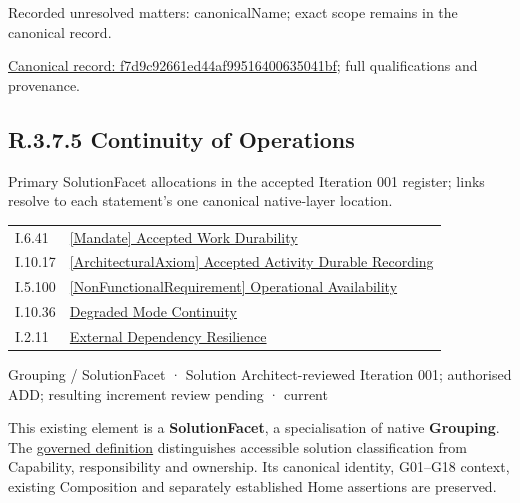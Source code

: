 {\small Recorded unresolved matters: canonicalName; exact scope remains in the canonical record.}\par
{\footnotesize \href{../../../../../../../continuum/grouping/f7d9c92661ed44af99516400635041bf.md}{Canonical record: f7d9c92661ed44af99516400635041bf}; full qualifications and provenance.}\par
\subsection*{R.3.7.5 Continuity of Operations}
\label{navigation:R.3.7.5}

Primary SolutionFacet allocations in the accepted Iteration 001 register; links resolve to each statement’s one canonical native-layer location.\par
\begin{longtable}{p{.22\linewidth}p{.73\linewidth}}
I.6.41 & \hyperref[element:eabd38371b6940289d9a4bf8e9773942]{[Mandate] Accepted Work Durability} \\
I.10.17 & \hyperref[element:6ee491b8c08d41868c3a7652fb794756]{[ArchitecturalAxiom] Accepted Activity Durable Recording} \\
I.5.100 & \hyperref[element:65ac0367b7f241149ad1839032004039]{[NonFunctionalRequirement] Operational Availability} \\
I.10.36 & \hyperref[element:51191ca802f54efb8554d20423199cd0]{Degraded Mode Continuity} \\
I.2.11 & \hyperref[element:150b3b1eea9b484b89ddc609bf550485]{External Dependency Resilience} \\
\end{longtable}
\label{element:41900f15d1d2431295a4b9dc1aa752c0}
{\small Grouping / SolutionFacet · Solution Architect-reviewed Iteration 001; authorised ADD; resulting increment review pending · current}\par

This existing element is a \textbf{SolutionFacet}, a specialisation of native
\textbf{Grouping}. The \href{\detokenize{../../../../../../../governance/continuum-representation.md#solutionfacet-classification--1119-candidate}}{governed definition}
distinguishes accessible solution classification from Capability, responsibility
and ownership. Its canonical identity, G01–G18 context, existing Composition
and separately established Home assertions are preserved.



